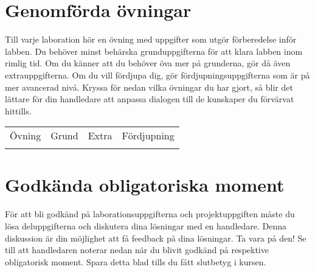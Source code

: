 
\label{progress-protocoll}


\section*{Genomförda övningar}

\vspace{1em}\noindent
{Till varje laboration hör en övning med uppgifter som utgör förberedelse inför labben. Du behöver minst behärska grunduppgifterna för att klara labben inom rimlig tid. Om du känner att du behöver öva mer på grunderna, gör då även extrauppgifterna. Om du vill fördjupa dig, gör fördjupningsuppgifterna som är på mer avancerad nivå. Kryssa för nedan vilka övningar du har gjort, så blir det lättare för din handledare att anpassa dialogen till de kunskaper du förvärvat hittills.}

\newcommand{\TickBox}{\raisebox{-.50ex}{\Large$\square$}}
\newcommand{\ExeRow}[1]{\hyperref[section:exe:#1]{\texttt{#1}} & \TickBox  &  \TickBox &  \TickBox  \\ \addlinespace }

\begin{table}[h]
\vspace{2em}
\begin{tabular}{lccc}
\toprule \addlinespace
{\sffamily Övning} &
{\sffamily Grund} &
{\sffamily Extra} &
{\sffamily Fördjupning}\\ \addlinespace \midrule \\[-0.7em]

\bottomrule
\end{tabular}
\end{table}

\newpage

\section*{Godkända obligatoriska moment}

\vspace{1em}\noindent
För att bli godkänd på laborationsuppgifterna och projektuppgiften måste du lösa deluppgifterna och diskutera dina lösningar med en handledare. Denna diskussion är din möjlighet att få feedback på dina lösningar. Ta vara på den!
Se till att handledaren noterar nedan när du blivit godkänd på respektive obligatorisk moment. Spara detta blad tills du fått slutbetyg i kursen.



